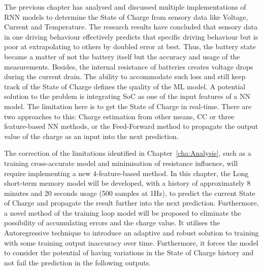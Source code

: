 
%
%
The previous chapter has analysed and discussed multiple implementations of RNN models to determine the State of Charge from sensory data like Voltage, Current and Temperature.
The research results have concluded that sensory data in one driving behaviour effectively predicts that specific driving behaviour but is poor at extrapolating to others by doubled error at best.
Thus, the battery state became a matter of not the battery itself but the accuracy and usage of the measurements.
Besides, the internal resistance of batteries creates voltage drops during the current drain.
The ability to accommodate such loss and still keep track of the State of Charge defines the quality of the ML model.
A potential solution to the problem is integrating SoC as one of the input features of a NN model.
The limitation here is to get the State of Charge in real-time.
There are two approaches to this: Charge estimation from other means, CC or three feature-based NN methods, or the Feed-Forward method to propagate the output value of the charge as an input into the next prediction.

%
%
The correction of the limitations identified in Chapter~\ref{cha:Analysis}, such as a training cross-accurate model and minimisation of resistance influence, will require implementing a new 4-feature-based method.
In this chapter, the Long short-term memory model will be developed, with a history of approximately 8 minutes and 20 seconds usage (500 samples at 1Hz), to predict the current State of Charge and propagate the result further into the next prediction.
Furthermore, a novel method of the training loop model will be proposed to eliminate the possibility of accumulating errors and the charge value.
It utilises the Autoregressive technique to introduce an adaptive and robust solution to training with some training output inaccuracy over time.
Furthermore, it forces the model to consider the potential of having variations in the State of Charge history and not fail the prediction in the following outputs.

